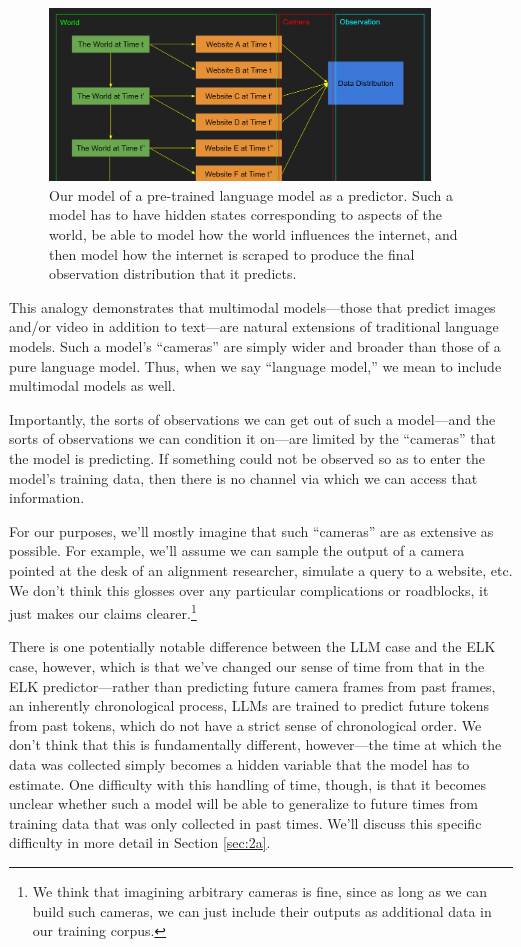 \documentclass[
  onecolumn,
  nonatbib,
]{miri-tech-article}
\begin{document}
\begin{figure}[h!]
  \centering
  \includegraphics[width=0.9\textwidth]{Mj4z48A.png}
  \caption{Our model of a pre-trained language model as a predictor. Such a model has to have hidden states corresponding to aspects of the world, be able to model how the world influences the internet, and then model how the internet is scraped to produce the final observation distribution that it predicts.}
\end{figure}

This analogy demonstrates that multimodal models---those that predict images and/or video in addition to text---are natural extensions of traditional language models. Such a model's ``cameras'' are simply wider and broader than those of a pure language model. Thus, when we say ``language model,'' we mean to include multimodal models as well.

Importantly, the sorts of observations we can get out of such a model---and the sorts of observations we can condition it on---are limited by the ``cameras'' that the model is predicting. If something could not be observed so as to enter the model's training data, then there is no channel via which we can access that information.

For our purposes, we'll mostly imagine that such ``cameras'' are as extensive as possible. For example, we'll assume we can sample the output of a camera pointed at the desk of an alignment researcher, simulate a query to a website, etc. We don't think this glosses over any particular complications or roadblocks, it just makes our claims clearer.\footnote{We think that imagining arbitrary cameras is fine, since as long as we can build such cameras, we can just include their outputs as additional data in our training corpus.}

There is one potentially notable difference between the LLM case and the ELK case, however, which is that we've changed our sense of time from that in the ELK predictor---rather than predicting future camera frames from past frames, an inherently chronological process, LLMs are trained to predict future tokens from past tokens, which do not have a strict sense of chronological order. We don't think that this is fundamentally different, however---the time at which the data was collected simply becomes a hidden variable that the model has to estimate. One difficulty with this handling of time, though, is that it becomes unclear whether such a model will be able to generalize to future times from training data that was only collected in past times. We'll discuss this specific difficulty in more detail in Section \ref{sec:2a}.
\end{document}
